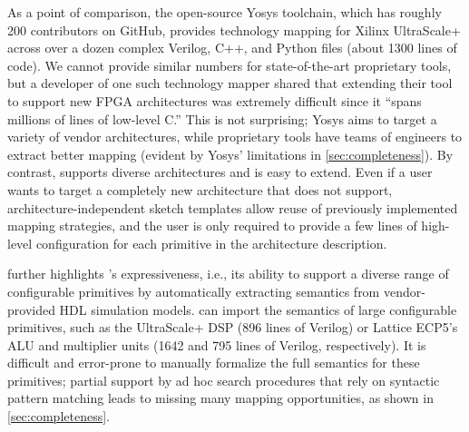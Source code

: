 As a point of comparison,
  the open-source Yosys toolchain,
  which has roughly 200 contributors on GitHub,
  provides technology mapping
  for Xilinx UltraScale+
  across over a dozen complex
  Verilog, C++, and Python files (about 1300
  lines of code).
We cannot provide similar numbers
  for state-of-the-art proprietary tools,
  but a developer
  of one such technology mapper
  shared that extending their tool to
  support new FPGA architectures
  was extremely difficult since it 
  ``spans millions of lines of low-level C.''
This is not surprising; Yosys aims to
  target a variety of vendor architectures, 
  while proprietary tools have teams of
  engineers to extract better mapping 
  (evident by Yosys' limitations
  in \cref{sec:completeness}).
By contrast,
  \lr supports
  diverse architectures and
  is easy to extend.
Even if a user
  wants to target a completely
  new architecture that
  \lr does not support,
  architecture-independent
  sketch templates allow reuse
  of previously implemented mapping
  strategies, and the user is
  only required to provide
  a few lines of
  high-level configuration
  for each primitive in 
  the architecture description.
  
 further
  highlights \lr's expressiveness,
  i.e., its ability to support a diverse
  range of configurable primitives
  by automatically extracting semantics from
  vendor-provided HDL simulation models.
\lr can import the semantics
  of large configurable primitives, 
  such as the UltraScale+ DSP (896 lines of Verilog)
  or Lattice ECP5's ALU and multiplier units (1642 and
  795 lines of Verilog, respectively).
It is difficult and error-prone
  to manually formalize the full semantics for these primitives;
  partial support by ad hoc search procedures
  that rely on syntactic pattern matching
  leads to missing many mapping opportunities,
  as shown in \cref{sec:completeness}.




